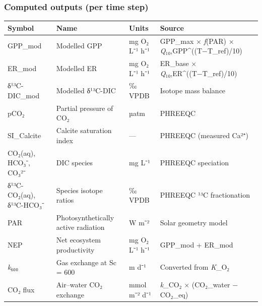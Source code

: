 \documentclass[
  letterpaper,
  DIV=11,
  numbers=noendperiod]{scrartcl}
\newcounter{none} %
\begin{document}
\subsubsection{Computed outputs (per time
step)}\label{computed-outputs-per-time-step}

{\def\LTcaptype{none} %
\begin{longtable}[]{@{}
  >{\raggedright\arraybackslash}p{}
  >{\raggedright\arraybackslash}p{}
  >{\raggedright\arraybackslash}p{}
  >{\raggedright\arraybackslash}p{}@{}}
\toprule\noalign{}
\begin{minipage}[b]{\linewidth}\raggedright
Symbol
\end{minipage} & \begin{minipage}[b]{\linewidth}\raggedright
Name
\end{minipage} & \begin{minipage}[b]{\linewidth}\raggedright
Units
\end{minipage} & \begin{minipage}[b]{\linewidth}\raggedright
Source
\end{minipage} \\
\midrule\noalign{}
\endhead
\bottomrule\noalign{}
\endlastfoot
GPP\_mod & Modelled GPP & mg O₂ L⁻¹ h⁻¹ & GPP\_max × \emph{f}(PAR) ×
\emph{Q}₁₀,GPP\^{}((T−T\_ref)/10) \\
ER\_mod & Modelled ER & mg O₂ L⁻¹ h⁻¹ & ER\_base ×
\emph{Q}₁₀,ER\^{}((T−T\_ref)/10) \\
δ¹³C-DIC\_mod & Modelled δ¹³C-DIC & ‰ VPDB & Isotope mass balance \\
pCO₂ & Partial pressure of CO₂ & µatm & PHREEQC \\
SI\_Calcite & Calcite saturation index & --- & PHREEQC (measured
Ca²⁺) \\
CO₂(aq), HCO₃⁻, CO₃²⁻ & DIC species & mg L⁻¹ & PHREEQC speciation \\
δ¹³C-CO₂(aq), δ¹³C-HCO₃⁻ & Species isotope ratios & ‰ VPDB & PHREEQC ¹³C
fractionation \\
PAR & Photosynthetically active radiation & W m⁻² & Solar geometry
model \\
NEP & Net ecosystem productivity & mg O₂ L⁻¹ h⁻¹ & GPP\_mod + ER\_mod \\
\emph{k}₆₀₀ & Gas exchange at Sc = 600 & m d⁻¹ & Converted from
\emph{K}\_O₂ \\
CO₂ flux & Air--water CO₂ exchange & mmol m⁻² d⁻¹ & \emph{k}\_CO₂ ×
(CO₂\_water − CO₂\_eq) \\
\end{longtable}
}
\end{document}

